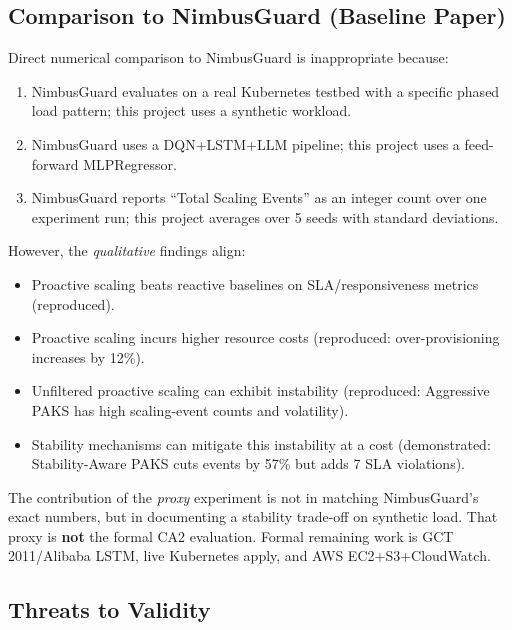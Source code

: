 \subsection{Comparison to NimbusGuard (Baseline Paper)}
\label{sec:comparison_nimbusguard}

Direct numerical comparison to NimbusGuard is inappropriate because:
\begin{enumerate}
  \item NimbusGuard evaluates on a real Kubernetes testbed with a specific phased load pattern; this project uses a synthetic workload.
  \item NimbusGuard uses a DQN+LSTM+LLM pipeline; this project uses a feed-forward MLPRegressor.
  \item NimbusGuard reports ``Total Scaling Events'' as an integer count over one experiment run; this project averages over 5 seeds with standard deviations.
\end{enumerate}

However, the \emph{qualitative} findings align:
\begin{itemize}
  \item Proactive scaling beats reactive baselines on SLA/responsiveness metrics (\checkmark reproduced).
  \item Proactive scaling incurs higher resource costs (\checkmark reproduced: over-provisioning increases by 12\%).
  \item Unfiltered proactive scaling can exhibit instability (\checkmark reproduced: Aggressive PAKS has high scaling-event counts and volatility).
  \item Stability mechanisms can mitigate this instability at a cost (\checkmark demonstrated: Stability-Aware PAKS cuts events by 57\% but adds 7 SLA violations).
\end{itemize}

The contribution of the \emph{proxy} experiment is not in matching NimbusGuard's exact numbers, but in documenting a stability trade-off on synthetic load. That proxy is \textbf{not} the formal CA2 evaluation. Formal remaining work is GCT 2011/Alibaba LSTM, live Kubernetes apply, and AWS EC2+S3+CloudWatch.

\subsection{Threats to Validity}
\label{sec:threats}

